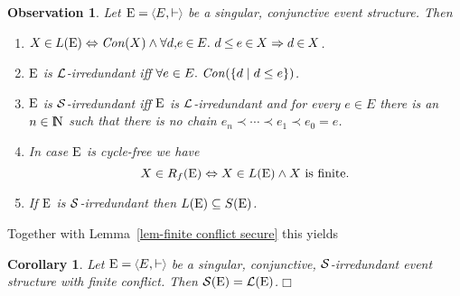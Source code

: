 \documentclass[twocolumn]{article}
\newcommand{\out}[1]{}        \newcommand{\ams}[1]{#1}      \usepackage[preserveurlmacro]{breakurl}
\newtheorem{coro}{Corollary}
\newtheorem{obs}{Observation}[section]
\newenvironment{corollary}[1]{\begin{coro} \rm \label{cor-#1} }{\end{coro}}
\newenvironment{observation}[1]{\begin{obs} \rm \label{obs-#1} }{\end{obs}}
\newcommand{\lem}[1]{Lemma~\ref{lem-#1}}
\newcommand{\turn}{\vdash}                              \newcommand{\dbigcup}{\bigcup_{\uparrow}}		\newcommand{\nbigcup}{\bigcup_{\bullet}}		\newcommand{\nbigcap}{\bigcap_{\bullet}}		\newcommand{\bbigcup}{\overline{\bigcup}}		\newcommand{\bbigcap}{\overline{\bigcap}}		\newcommand{\nbbigcap}{\bbigcap_{\bullet}}		\newcommand{\fbbigcup}{\overline{\bigcup}^f}		\newcommand{\bbbigcup}{\overline{\bigcup}^2}		\newcommand{\dcup}{~~\makebox[0pt]{\LARGE$\cdot$}\makebox[0pt]{$\cup$}~~}
\newcommand{\dl}[1]{\mbox{\rm I\hspace{-0.75mm}#1}}     \newcommand{\dc}[1]{\mbox{\rm {\raisebox{.4ex}{\makebox [0pt][l]{\hspace{.2em}\scriptsize $\mid$}}}#1}}
\newcommand{\IN}{\dl{N}}                        \newcommand{\IQ}{\dc{Q}}                        \newcommand{\IC}{\dc{C}}                        \newcommand{\IE}{\dl{E}}                        \newcommand{\IG}{\dc{G}}                        \newcommand{\fC}{{\cal C}}                      \newcommand{\fE}{{\cal E}}                      \newcommand{\fG}{{\cal G}}                      \newcommand{\fN}{{\cal N}}                      \newcommand{\fF}{{\cal F}}                      \newcommand{\fL}{{\cal L}}                      \newcommand{\fM}{{\cal M}}                      \newcommand{\fS}{{\cal S}}                      \newcommand{\fR}{{\cal R}}                      \newcommand{\eC}{{\rm C}}                       \newcommand{\eD}{{\rm D}}                       \newcommand{\eE}{{\rm E}}                       \newcommand{\eF}{{\rm F}}                       \newcommand{\eG}{{\rm G}}                       \newcommand{\eH}{{\rm H}}                       \newcommand{\eK}{{\rm K}}                       \newcommand{\eL}{{\rm L}}                       \newcommand{\eN}{{\rm N}}                       \newcommand{\eP}{{\rm P}}                       \newcommand{\eM}{{\rm M}}                       \newcommand{\eT}{{\rm T}}                       \newcommand{\fT}{{\cal T}}
\begin{document}
\begin{observation}{prime-secured}
Let $\eE=\tuple{E,\turn\;}$ be a singular, conjunctive event structure.
Then
\begin{enumerate}
\item $X \mathbin\in L(\eE) \Leftrightarrow \ConGP(X) \wedge  \forall d,\!e
\mathbin\in E.~ d \mathbin\leq e \mathbin\in X  \Rightarrow d \mathbin\in X$.
\item $\eE$ is $\fL$-irredundant iff $\forall e\in E.~{\it Con}(\{d\mid d\leq e\})$.
\item $\eE$ is $\fS$-irredundant iff $\eE$ is $\fL$-irredundant and
for every $e\in E$ there is an $n\in\IN$ such that there is no chain
$e_n \prec \cdots \prec e_1 \prec e_0 = e$.
\item In case $\eE$ is cycle-free we have\vspace{-1ex}
$$X \in R_f(\eE) \Leftrightarrow X \in L(\eE) \wedge X \mbox{ is finite.}
\vspace{-1ex}$$
\item If $\eE$ is $\fS$-irredundant then $L(\eE)\subseteq S(\eE)$.
\end{enumerate}
\out{
 $$X \in S(\eE) \Leftrightarrow \left\{\begin{array}{@{}l@{}}
 \forall Y \subseteq_{\it fin} X.~ \fCon(Y) \, \wedge\\
 \forall d,e \in E.~ d \leq e \in X  \Rightarrow d \in X\\
 \wedge \mbox{ there is no infinite chain }\\
  \cdots \prec e_2 \prec e_1 \prec e_0 \in X.
 \end{array}\right.$$
 If $\eE$ moreover is rooted and with binary conflict, then
 $$X \in S(\eE) \Leftrightarrow \left\{\begin{array}{@{}l@{}}
 \forall d,e \in X.~ \neg (d \# e) \, \wedge\\
 \forall d,e \in E.~ d \leq e \in X  \Rightarrow d \in X.
 \end{array}\right.$$
 Let $\eE$ be a singular, conjunctive event structure.
 In case $\eE$ is cycle-free, every
 finite set $X$ in $L(\eE)$ can be seen to be in $R_f(\eE)$:
 $$X \in R_f(\eE) \Leftrightarrow \left\{\begin{array}{@{}l@{}}
 \fCon(X) \, \wedge\\
 \forall d,e \in E.~ d \leq e \in X  \Rightarrow d \in X.
 \end{array}\right.$$
 If $\eE$ moreover is rooted and with binary conflict, then
 $$X \in R_f(\eE) \Leftrightarrow \left\{\begin{array}{@{}l@{}}
 X \mbox{ is finite} \, \wedge
 \forall d,e \in X.~ \neg (d \# e) \, \wedge\\
 \forall d,e \in E.~ d \leq e \in X  \Rightarrow d \in X.
 \end{array}\right.$$
}
\end{observation}
Together with \lem{finite conflict secure} this yields
\begin{corollary}{prime-secured}
Let $\eE=\tuple{E,\turn\;}$ be a singular, conjunctive,
$\fS$-irredundant event structure with finite conflict.
Then $\fS(\eE)=\fL(\eE)$.\hfill$\Box$
\end{corollary}
\end{document}
